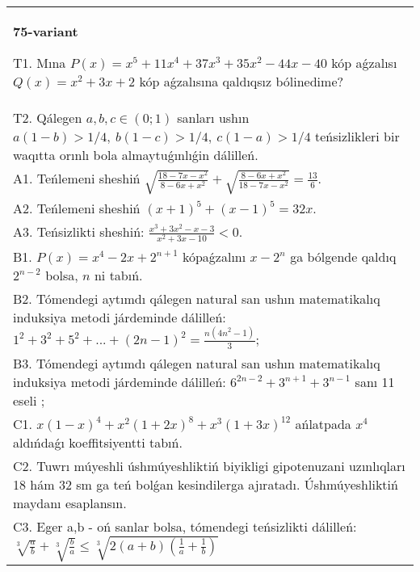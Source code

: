 \documentclass{article}
\begin{document}
\begin{tabular}{m{17cm}}
\textbf{75-variant}
\newline

T1. Mına \(P(x) = x^{5} + 11x^{4} + 37x^{3} + 35x^{2} - 44x - 40\) kóp aǵzalısı \(Q(x) = x^{2} + 3x + 2\) kóp aǵzalısına qaldıqsız bólinedime? \\
T2. Qálegen \(a,b,c \in (0;1)\) sanları ushın \(a(1 - b) > 1/4,\ b(1 - c) > 1/4,\ c(1 - a) > 1/4\) teńsizlikleri bir waqıtta orınlı bola almaytuǵınlıǵin dálilleń. \\
A1. Teńlemeni sheshiń \(\sqrt{\frac{18 - 7x - x^{2}}{8 - 6x + x^{2}}} + \sqrt{\frac{8 - 6x + x^{2}}{18 - 7x - x^{2}}} = \frac{13}{6}\). \\
A2. Teńlemeni sheshiń \((x + 1)^{5} + (x - 1)^{5} = 32x\). \\
A3. Teńsizlikti sheshiń: \(\frac{x^{3} + 3x^{2} - x - 3}{x^{2} + 3x - 10} < 0\). \\
B1. \(P(x) = x^{4} - 2x + 2^{n + 1}\) kópaǵzalını \(x - 2^{n}\) ga bólgende qaldıq \(2^{n - 2}\) bolsa, \(n\) ni tabıń. \\
B2. Tómendegi aytımdı qálegen natural san ushın matematikalıq induksiya metodi járdeminde dálilleń: \(1^{2} + 3^{2} + 5^{2} + ... + (2n - 1)^{2} = \frac{n\left( 4n^{2} - 1 \right)}{3}\); \\
B3. Tómendegi aytımdı qálegen natural san ushın matematikalıq induksiya metodi járdeminde dálilleń: \(6^{2n - 2} + 3^{n + 1} + 3^{n - 1}\) sanı 11 eseli ; \\
C1. \(x(1 - x)^{4} + x^{2}(1 + 2x)^{8} + x^{3}(1 + 3x)^{12}\) ańlatpada \(x^{4}\) aldıńdaǵı koeffitsiyentti tabıń. \\
C2. Tuwrı múyeshli úshmúyeshliktiń biyikligi gipotenuzani uzınlıqları 18 hám 32 sm ga teń bolǵan kesindilerga ajıratadı. Úshmúyeshliktiń maydanı esaplansın. \\
C3. Eger a,b - oń sanlar bolsa, tómendegi teńsizlikti dálilleń: \(\sqrt[3]{\frac{a}{b}} + \sqrt[3]{\frac{b}{a}} \leq \sqrt[3]{2(a + b)\left( \frac{1}{a} + \frac{1}{b} \right)}\) \\

\end{tabular}
\vspace{1cm}
\end{document}

